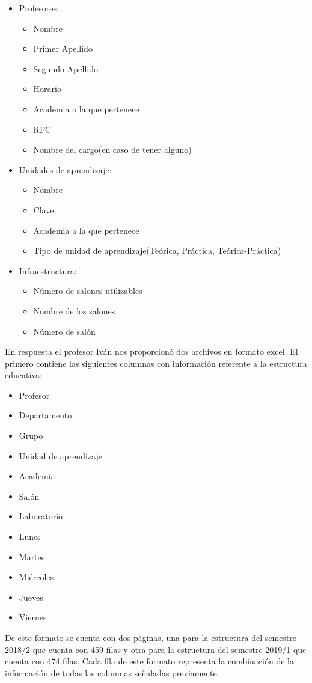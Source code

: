 \begin{itemize}
	\item Profesores:
		\begin{itemize}
			\item Nombre
			\item Primer Apellido
			\item Segundo Apellido
			\item Horario
			\item Academia a la que pertenece
			\item RFC
			\item Nombre del cargo(en caso de tener alguno)
		\end{itemize}	
	\item Unidades de aprendizaje:
		\begin{itemize}
			\item Nombre
			\item Clave
			\item Academia a la que pertenece
			\item Tipo de unidad de aprendizaje(Teórica, Práctica, Teórica-Práctica)
		\end{itemize}
	\item Infraestructura:
		\begin{itemize}
			\item Número de salones utilizables
			\item Nombre de los salones
			\item Número de salón
		\end{itemize}
\end{itemize}

En respuesta el profesor Iván nos proporcionó dos archivos en formato excel. El primero contiene las siguientes columnas con información referente a la estructura educativa:
	\begin{itemize}
		\item Profesor
		\item Departamento
		\item Grupo
		\item Unidad de aprendizaje
		\item Academia
		\item Salón
		\item Laboratorio
		\item Lunes
		\item Martes
		\item Miércoles
		\item Jueves
		\item Viernes
	\end{itemize}
De este formato se cuenta con dos páginas, una para la estructura del semestre 2018/2 que cuenta con 459 filas y otra para la estructura del semestre 2019/1 que cuenta con 474 filas. Cada fila de este formato representa la combinación de la información de todas las columnas señaladas previamente.\\


